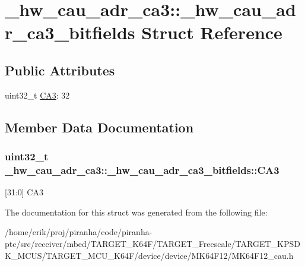 \hypertarget{struct__hw__cau__adr__ca3_1_1__hw__cau__adr__ca3__bitfields}{}\section{\+\_\+hw\+\_\+cau\+\_\+adr\+\_\+ca3\+:\+:\+\_\+hw\+\_\+cau\+\_\+adr\+\_\+ca3\+\_\+bitfields Struct Reference}
\label{struct__hw__cau__adr__ca3_1_1__hw__cau__adr__ca3__bitfields}
\subsection*{Public Attributes}
\begin{DoxyCompactItemize}
\item 
uint32\+\_\+t \hyperlink{struct__hw__cau__adr__ca3_1_1__hw__cau__adr__ca3__bitfields_a08cf760c0aa894024d4b63d960b847b4}{C\+A3}\+: 32
\end{DoxyCompactItemize}


\subsection{Member Data Documentation}
\subsubsection[{\texorpdfstring{C\+A3}{CA3}}]{\setlength{\rightskip}{0pt plus 5cm}uint32\+\_\+t \+\_\+hw\+\_\+cau\+\_\+adr\+\_\+ca3\+::\+\_\+hw\+\_\+cau\+\_\+adr\+\_\+ca3\+\_\+bitfields\+::\+C\+A3}\hypertarget{struct__hw__cau__adr__ca3_1_1__hw__cau__adr__ca3__bitfields_a08cf760c0aa894024d4b63d960b847b4}{}\label{struct__hw__cau__adr__ca3_1_1__hw__cau__adr__ca3__bitfields_a08cf760c0aa894024d4b63d960b847b4}
\mbox{[}31\+:0\mbox{]} C\+A3 

The documentation for this struct was generated from the following file\+:\begin{DoxyCompactItemize}
\item 
/home/erik/proj/piranha/code/piranha-\/ptc/src/receiver/mbed/\+T\+A\+R\+G\+E\+T\+\_\+\+K64\+F/\+T\+A\+R\+G\+E\+T\+\_\+\+Freescale/\+T\+A\+R\+G\+E\+T\+\_\+\+K\+P\+S\+D\+K\+\_\+\+M\+C\+U\+S/\+T\+A\+R\+G\+E\+T\+\_\+\+M\+C\+U\+\_\+\+K64\+F/device/device/\+M\+K64\+F12/M\+K64\+F12\+\_\+cau.\+h\end{DoxyCompactItemize}

